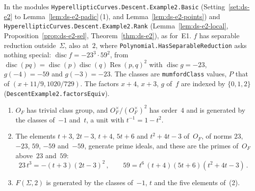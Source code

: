 \begin{remark}[Formalization]
In the modules \texttt{HyperellipticCurves.Descent.Example2.Basic} (Setting~\ref{set:ds-e2} to
Lemma~\ref{lem:ds-e2-padic}\,(1), and Lemma~\ref{lem:ds-e2-points}) and
\texttt{HyperellipticCurves.Descent.Example2.Rank} (Lemma~\ref{lem:ds-e2-local},
Proposition~\ref{prop:ds-e2-sel}, Theorem~\ref{thm:ds-e2}), as for~E1. $f$ has separable reduction
outside~$\Sigma$, also at~$2$, where \texttt{Polynomial.HasSeparableReduction} asks nothing special:
$\operatorname{disc} f = -23^3 \cdot 59^2$, from
$\operatorname{disc}(pq) = \operatorname{disc}(p) \operatorname{disc}(q) \operatorname{Res}(p, q)^2$
with $\operatorname{disc} g = -23$, $g(-4) = -59$ and $g(-3) = -23$. The classes are
\texttt{mumfordClass} values, $P$ that of $(x + 11/9, 1020/729)$. The factors $x + 4$, $x + 3$, $g$
of~$f$ are indexed by $\{0, 1, 2\}$ (\texttt{DescentExample2.factorsEquiv}).
\end{remark}

\begin{lemma}
\label{lem:ds-e2-field}
\leanok
{}
\begin{enumerate}
  \item $O_F$ has trivial class group, and $O_F^\times/(O_F^\times)^2$ has order~$4$ and is
    generated by the classes of~$-1$ and~$t$, a unit with $t^{-1} = 1 - t^2$.
  \item The elements $t + 3$, $2t - 3$, $t + 4$, $5t + 6$ and $t^2 + 4t - 3$ of~$O_F$, of norms
    $23$, $-23$, $59$, $-59$ and~$-59$, generate prime ideals, and these are the primes of~$O_F$
    above~$23$ and~$59$:
    \[ 23\,t^3 = -(t + 3)(2t - 3)^2\,, \qquad 59 = t^6\,(t + 4)(5t + 6)(t^2 + 4t - 3)\,. \]
  \item $F(\Sigma, 2)$ is generated by the classes of~$-1$, $t$ and the five elements of~(2).
\end{enumerate}
\end{lemma}

